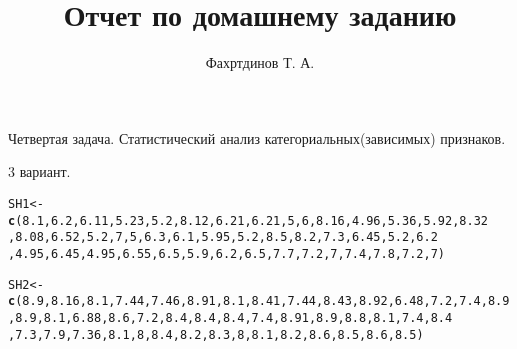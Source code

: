 \documentclass{article}\usepackage[]{graphicx}\usepackage[]{color}
\makeatletter
\newcommand{\hlnum}[1]{\textcolor[rgb]{0.686,0.059,0.569}{#1}}%
\newcommand{\hlstd}[1]{\textcolor[rgb]{0.345,0.345,0.345}{#1}}%
\newcommand{\hlkwb}[1]{\textcolor[rgb]{0.69,0.353,0.396}{#1}}%
\newcommand{\hlkwd}[1]{\textcolor[rgb]{0.737,0.353,0.396}{\textbf{#1}}}%
\newenvironment{kframe}{%
 \def\at@end@of@kframe{}%
 \ifinner\ifhmode%
  \def\at@end@of@kframe{\end{minipage}}%
  \begin{minipage}{\columnwidth}%
 \fi\fi%
 \def\FrameCommand##1{\hskip\@totalleftmargin \hskip-\fboxsep
 \colorbox{shadecolor}{##1}\hskip-\fboxsep
     \hskip-\linewidth \hskip-\@totalleftmargin \hskip\columnwidth}%
 \MakeFramed {\advance\hsize-\width
   \@totalleftmargin\z@ \linewidth\hsize
   \@setminipage}}%
 {\par\unskip\endMakeFramed%
 \at@end@of@kframe}
\newenvironment{knitrout}{}{} %
\makeatother
\begin{document}
\title{Отчет по домашнему заданию}
\pretitle{\vspace{\droptitle}\centering\huge}
\posttitle{\par}
\author{Фахртдинов Т. А.}


\maketitle
Четвертая задача. Статистический анализ категориальных(зависимых) признаков.

3 вариант.
\begin{knitrout}
\color{fgcolor}\begin{kframe}
\begin{alltt}
\hlstd{SH1} \hlkwb{<-} \hlkwd{c}\hlstd{(}\hlnum{8.1}\hlstd{,} \hlnum{6.2}\hlstd{,} \hlnum{6.11}\hlstd{,} \hlnum{5.23}\hlstd{,} \hlnum{5.2}\hlstd{,} \hlnum{8.12}\hlstd{,} \hlnum{6.21}\hlstd{,} \hlnum{6.21}\hlstd{,} \hlnum{5}\hlstd{,} \hlnum{6}\hlstd{,} \hlnum{8.16}\hlstd{,} \hlnum{4.96}\hlstd{,} \hlnum{5.36}\hlstd{,} \hlnum{5.92}\hlstd{,} \hlnum{8.32}
         \hlstd{,} \hlnum{8.08}\hlstd{,} \hlnum{6.52}\hlstd{,} \hlnum{5.2}\hlstd{,} \hlnum{7}\hlstd{,} \hlnum{5}\hlstd{,} \hlnum{6.3}\hlstd{,} \hlnum{6.1}\hlstd{,} \hlnum{5.95}\hlstd{,} \hlnum{5.2}\hlstd{,} \hlnum{8.5}\hlstd{,} \hlnum{8.2}\hlstd{,} \hlnum{7.3}\hlstd{,} \hlnum{6.45}\hlstd{,} \hlnum{5.2}\hlstd{,} \hlnum{6.2}
         \hlstd{,} \hlnum{4.95}\hlstd{,} \hlnum{6.45}\hlstd{,} \hlnum{4.95}\hlstd{,} \hlnum{6.55}\hlstd{,} \hlnum{6.5}\hlstd{,} \hlnum{5.9}\hlstd{,} \hlnum{6.2}\hlstd{,} \hlnum{6.5}\hlstd{,} \hlnum{7.7}\hlstd{,} \hlnum{7.2}\hlstd{,} \hlnum{7}\hlstd{,} \hlnum{7.4}\hlstd{,} \hlnum{7.8}\hlstd{,} \hlnum{7.2}\hlstd{,} \hlnum{7}\hlstd{)}

\hlstd{SH2} \hlkwb{<-} \hlkwd{c}\hlstd{(}\hlnum{8.9}\hlstd{,} \hlnum{8.16}\hlstd{,} \hlnum{8.1}\hlstd{,} \hlnum{7.44}\hlstd{,} \hlnum{7.46}\hlstd{,} \hlnum{8.91}\hlstd{,} \hlnum{8.1}\hlstd{,}\hlnum{8.41}\hlstd{,} \hlnum{7.44}\hlstd{,} \hlnum{8.43}\hlstd{,} \hlnum{8.92}\hlstd{,} \hlnum{6.48}\hlstd{,} \hlnum{7.2}\hlstd{,} \hlnum{7.4}\hlstd{,} \hlnum{8.9}
         \hlstd{,} \hlnum{8.9}\hlstd{,} \hlnum{8.1}\hlstd{,} \hlnum{6.88}\hlstd{,} \hlnum{8.6}\hlstd{,} \hlnum{7.2}\hlstd{,} \hlnum{8.4}\hlstd{,} \hlnum{8.4}\hlstd{,} \hlnum{8.4}\hlstd{,} \hlnum{7.4}\hlstd{,} \hlnum{8.91}\hlstd{,} \hlnum{8.9}\hlstd{,} \hlnum{8.8}\hlstd{,} \hlnum{8.1}\hlstd{,} \hlnum{7.4}\hlstd{,} \hlnum{8.4}
         \hlstd{,} \hlnum{7.3}\hlstd{,} \hlnum{7.9}\hlstd{,} \hlnum{7.36}\hlstd{,} \hlnum{8.1}\hlstd{,} \hlnum{8}\hlstd{,} \hlnum{8.4} \hlstd{,} \hlnum{8.2}\hlstd{,} \hlnum{8.3}\hlstd{,} \hlnum{8}\hlstd{,} \hlnum{8.1}\hlstd{,} \hlnum{8.2}\hlstd{,} \hlnum{8.6}\hlstd{,} \hlnum{8.5}\hlstd{,} \hlnum{8.6}\hlstd{,} \hlnum{8.5}\hlstd{)}
\end{alltt}
\end{kframe}
\end{knitrout}
\end{document}

